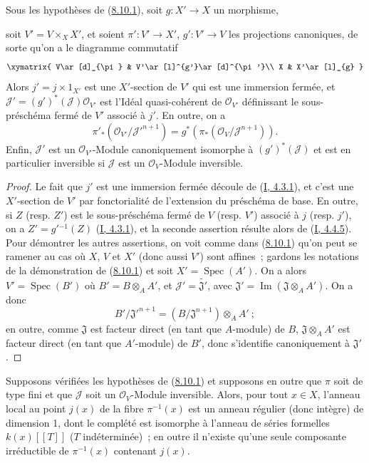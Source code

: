 \begin{lemma}[8.10.2]
\label{II.8.10.2-fr}
Sous les hypothèses de (\hyperref[II.8.10.1-fr]{8.10.1}), soit
$g:X'\to X$ un morphisme,

soit $V'=V\times_X X'$, et soient $\pi':V'\to X'$,
$g':V'\to V$ les projections canoniques, de sorte qu'on a le diagramme
commutatif
\[
  \xymatrix{
    V\ar[d]_{\pi} & V'\ar[l]^{g'}\ar[d]^{\pi'}\\
    X & X'\ar[l]_{g}
  }
\]
Alors $j'=j\times1_{X'}$ est une $X'$-section de $V'$ qui est une immersion
fermée, et $\mathcal{J}'=(g')^*(\mathcal{J})\mathcal{O}_{V'}$ est l'Idéal
quasi-cohérent de $\mathcal{O}_{V'}$ définissant le sous-préschéma fermé de
$V'$ associé à $j'$. En outre, on a
\[
  \pi'_*(\mathcal{O}_{V'}/\mathcal{J}'^{n+1})
  =g^*(\pi_*(\mathcal{O}_V/\mathcal{J}^{n+1})).
\]
Enfin, $\mathcal{J}'$ est un $\mathcal{O}_{V'}$-Module canoniquement isomorphe
à $(g')^*(\mathcal{J})$ et est en particulier inversible si $\mathcal{J}$ est
un $\mathcal{O}_V$-Module inversible.
\end{lemma}

\begin{proof}
Le fait que $j'$ est une immersion fermée découle de
(\hyperref[I.4.3.1-fr]{I, 4.3.1}), et c'est une $X'$-section de $V'$ par
fonctorialité de l'extension du préschéma de base. En outre, si $Z$ (resp.
$Z'$) est le sous-préschéma fermé de $V$ (resp. $V'$) associé à $j$ (resp.
$j'$), on a $Z'=g'{}^{-1}(Z)$
(\hyperref[I.4.3.1-fr]{I, 4.3.1}), et la seconde assertion résulte alors de
(\hyperref[I.4.4.5-fr]{I, 4.4.5}). Pour démontrer les autres assertions, on
voit comme dans (\hyperref[II.8.10.1-fr]{8.10.1}) qu'on peut se ramener au cas
où $X$, $V$ et $X'$ (donc aussi $V'$) sont affines~; gardons les notations de
la démonstration de (\hyperref[II.8.10.1-fr]{8.10.1}) et soit
$X'=\operatorname{Spec}(A')$. On a alors $V'=\operatorname{Spec}(B')$ où
$B'=B\otimes_A A'$, et $\mathcal{J}'=\widetilde{\mathfrak{J}'}$, avec
$\mathfrak{J}'=\operatorname{Im}(\mathfrak{J}\otimes_A A')$. On a donc
\[
  B'/\mathfrak{J}'^{n+1}=(B/\mathfrak{J}^{n+1})\otimes_A A'~;
\]
en outre, comme $\mathfrak{J}$ est facteur direct (en tant que $A$-module) de
$B$, $\mathfrak{J}\otimes_A A'$ est facteur direct (en tant que $A'$-module)
de $B'$, donc s'identifie canoniquement à $\mathfrak{J}'$.
\end{proof}

\begin{corollary}[8.10.3]
\label{II.8.10.3-fr}
Supposons vérifiées les hypothèses de (\hyperref[II.8.10.1-fr]{8.10.1}) et
supposons en outre que $\pi$ soit de type fini et que $\mathcal{J}$ soit un
$\mathcal{O}_V$-Module inversible. Alors, pour tout $x\in X$, l'anneau local
au point $j(x)$ de la fibre $\pi^{-1}(x)$ est un anneau régulier (donc
intègre) de dimension 1, dont le complété est isomorphe à l'anneau de séries
formelles $k(x)[[T]]$ ($T$ indéterminée)~; en outre il n'existe qu'une seule
composante irréductible de $\pi^{-1}(x)$ contenant $j(x)$.
\end{corollary}

